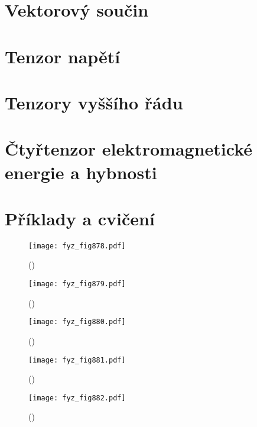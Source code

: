   \section{Vektorový součin}\label{fyz:IIchapXXXIsecV}
  \section{Tenzor napětí}\label{fyz:IIchapXXXIsecVI}
  \section{Tenzory vyššího řádu}\label{fyz:IIchapXXXIsecVII}
  \section{Čtyřtenzor elektromagnetické energie a hybnosti}\label{fyz:IIchapXXXIsecVIII}
  \section{Příklady a cvičení}\label{fyz:IIchapXXXIsecIX}









    \begin{figure}[ht!] %
      \centering
      \texttt{[image: fyz\_fig878.pdf]}
      \caption{
               (\cite[s.~707]{Feynman02})}
      \label{fyz:fig878}
    \end{figure}

    \begin{figure}[ht!] %
      \centering
      \texttt{[image: fyz\_fig879.pdf]}
      \caption{
               (\cite[s.~707]{Feynman02})}
      \label{fyz:fig879}
    \end{figure}

    \begin{figure}[ht!] %
      \centering
      \texttt{[image: fyz\_fig880.pdf]}
      \caption{
               (\cite[s.~707]{Feynman02})}
      \label{fyz:fig880}
    \end{figure}

    \begin{figure}[ht!] %
      \centering
      \texttt{[image: fyz\_fig881.pdf]}
      \caption{
               (\cite[s.~707]{Feynman02})}
      \label{fyz:fig881}
    \end{figure}

    \begin{figure}[ht!] %
      \centering
      \texttt{[image: fyz\_fig882.pdf]}
      \caption{
               (\cite[s.~707]{Feynman02})}
      \label{fyz:fig882}
    \end{figure}


